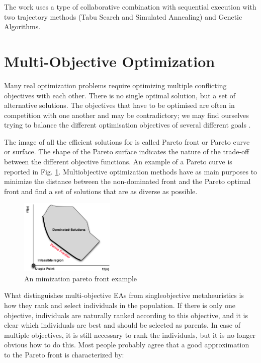 The work uses a type of collaborative combination with sequential execution with two trajectory methods (Tabu Search and Simulated Annealing) and Genetic Algorithms.

\section{Multi-Objective Optimization}

Many real optimization problems require optimizing multiple conflicting objectives with each other. There is no single optimal solution, but a set of alternative solutions. The objectives that have to be optimised are often in competition with one another and may be contradictory; we may find ourselves trying to balance the different optimisation objectives of several different goals \cite{Harman2010} \cite{el2014local}.

The image of all the efficient solutions for is called Pareto front or Pareto curve or surface. The shape of the Pareto surface indicates the nature of the trade-off between the different objective functions. An example of a Pareto curve is reported in Fig. \ref{fig:pareto1}. Multiobjective optimization methods have as main purposes to minimize the distance between the non-dominated front and the Pareto optimal front and find a set of solutions that are as diverse as possible. 

\begin{figure}[h]
\centering
\includegraphics[width=0.4\textwidth]{./images/paretofront.png}
\caption{An mimization pareto front example}
\label{fig:pareto1}
\end{figure}

What distinguishes multi-objective EAs from singleobjective metaheuristics is how they rank and select individuals in the population. If there is only one objective, individuals are naturally ranked according to this objective, and it is clear which individuals are best and should be selected as
parents. In case of multiple objectives, it is still necessary to rank the individuals, but it is no longer obvious how to do this. Most people probably agree that a good approximation to the Pareto front is characterized by:

